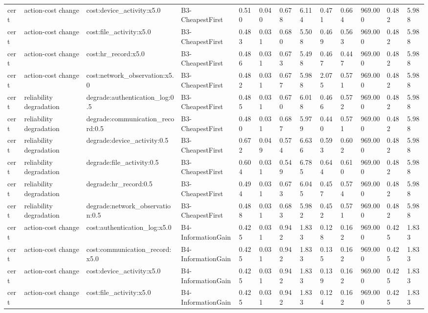 \begin{table}[!ht]
{\begin{tabular}{lllllllllllll}
cert & action-cost change & cost:device\_activity:x5.0 & B3-CheapestFirst & 0.510 & 0.040 & 0.678 & 6.114 & 0.471 & 0.664 & 969.000 & 0.482 & 5.988 \\
cert & action-cost change & cost:file\_activity:x5.0 & B3-CheapestFirst & 0.483 & 0.031 & 0.680 & 5.508 & 0.469 & 0.563 & 969.000 & 0.482 & 5.988 \\
cert & action-cost change & cost:hr\_record:x5.0 & B3-CheapestFirst & 0.486 & 0.031 & 0.673 & 5.498 & 0.467 & 0.447 & 969.000 & 0.482 & 5.988 \\
cert & action-cost change & cost:network\_observation:x5.0 & B3-CheapestFirst & 0.482 & 0.031 & 0.677 & 5.988 & 2.075 & 0.571 & 969.000 & 0.482 & 5.988 \\
cert & reliability degradation & degrade:authentication\_log:0.5 & B3-CheapestFirst & 0.485 & 0.031 & 0.670 & 6.018 & 0.466 & 0.572 & 969.000 & 0.482 & 5.988 \\
cert & reliability degradation & degrade:communication\_record:0.5 & B3-CheapestFirst & 0.480 & 0.031 & 0.687 & 5.979 & 0.440 & 0.571 & 969.000 & 0.482 & 5.988 \\
cert & reliability degradation & degrade:device\_activity:0.5 & B3-CheapestFirst & 0.672 & 0.049 & 0.574 & 6.636 & 0.593 & 0.602 & 969.000 & 0.482 & 5.988 \\
cert & reliability degradation & degrade:file\_activity:0.5 & B3-CheapestFirst & 0.604 & 0.031 & 0.549 & 6.785 & 0.644 & 0.610 & 969.000 & 0.482 & 5.988 \\
cert & reliability degradation & degrade:hr\_record:0.5 & B3-CheapestFirst & 0.494 & 0.031 & 0.673 & 6.045 & 0.457 & 0.574 & 969.000 & 0.482 & 5.988 \\
cert & reliability degradation & degrade:network\_observation:0.5 & B3-CheapestFirst & 0.488 & 0.031 & 0.683 & 5.982 & 0.452 & 0.571 & 969.000 & 0.482 & 5.988 \\
cert & action-cost change & cost:authentication\_log:x5.0 & B4-InformationGain & 0.425 & 0.031 & 0.942 & 1.833 & 0.128 & 0.162 & 969.000 & 0.425 & 1.833 \\
cert & action-cost change & cost:communication\_record:x5.0 & B4-InformationGain & 0.425 & 0.031 & 0.942 & 1.833 & 0.135 & 0.162 & 969.000 & 0.425 & 1.833 \\
cert & action-cost change & cost:device\_activity:x5.0 & B4-InformationGain & 0.425 & 0.031 & 0.942 & 1.833 & 0.139 & 0.162 & 969.000 & 0.425 & 1.833 \\
cert & action-cost change & cost:file\_activity:x5.0 & B4-InformationGain & 0.425 & 0.031 & 0.942 & 1.833 & 0.124 & 0.162 & 969.000 & 0.425 & 1.833 \\

\end{tabular}}
\end{table}
